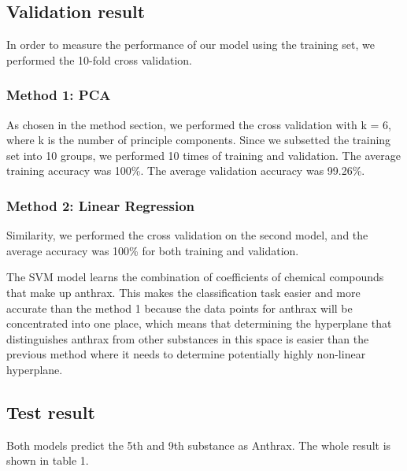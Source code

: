 \documentclass[12pt,onecolumn,letterpaper]{article}
\begin{document}
\subsection{Validation result}

In order to measure the performance of our model using the training set, we performed the 10-fold cross validation.

\subsubsection{Method 1: PCA}

As chosen in the method section, we performed the cross validation with k = 6, where k is the number of principle components. Since we subsetted the training set into 10 groups, we performed 10 times of training and validation. The average training accuracy was 100\%. The average validation accuracy was 99.26\%. 

\subsubsection{Method 2: Linear Regression}

Similarity, we performed the cross validation on the second model, and the average accuracy was 100\% for both training and validation.

The SVM model learns the combination of coefficients of chemical compounds that make up anthrax. This makes the classification task easier and more accurate than the method 1 because the data points for anthrax will be concentrated into one place, which means that determining the hyperplane that distinguishes anthrax from other substances in this space is easier than the previous method where it needs to determine potentially highly non-linear hyperplane.  

\subsection{Test result}

Both models predict the 5th and 9th substance as Anthrax. The whole result is shown in table 1.  
\end{document}
